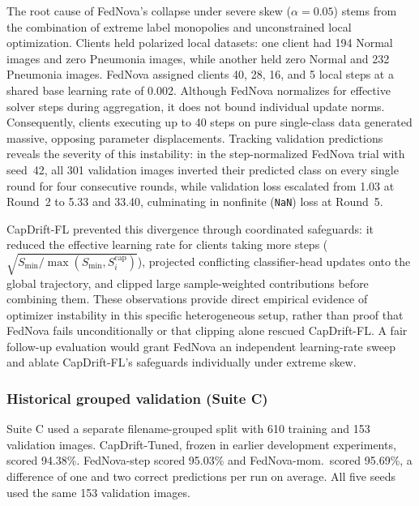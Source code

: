 \documentclass[conference]{IEEEtran}
\begin{document}
The root cause of FedNova's collapse under severe skew ($\alpha=0.05$) stems from the combination of extreme label monopolies and unconstrained local optimization. Clients held polarized local datasets: one client had 194 Normal images and zero Pneumonia images, while another held zero Normal and 232 Pneumonia images. FedNova assigned clients 40, 28, 16, and 5 local steps at a shared base learning rate of 0.002. Although FedNova normalizes for effective solver steps during aggregation, it does not bound individual update norms. Consequently, clients executing up to 40 steps on pure single-class data generated massive, opposing parameter displacements. Tracking validation predictions reveals the severity of this instability: in the step-normalized FedNova trial with seed~42, all 301 validation images inverted their predicted class on every single round for four consecutive rounds, while validation loss escalated from 1.03 at Round~2 to 5.33 and 33.40, culminating in nonfinite (\texttt{NaN}) loss at Round~5.

CapDrift-FL prevented this divergence through coordinated safeguards: it reduced the effective learning rate for clients taking more steps ($\sqrt{S_{\min}/\max(S_{\min}, S_i^{\mathrm{cap}})}$), projected conflicting classifier-head updates onto the global trajectory, and clipped large sample-weighted contributions before combining them. These observations provide direct empirical evidence of optimizer instability in this specific heterogeneous setup, rather than proof that FedNova fails unconditionally or that clipping alone rescued CapDrift-FL. A fair follow-up evaluation would grant FedNova an independent learning-rate sweep and ablate CapDrift-FL's safeguards individually under extreme skew.

\subsubsection{Historical grouped validation (Suite C)}

Suite C used a separate filename-grouped split with 610 training and 153 validation images. CapDrift-Tuned, frozen in earlier development experiments, scored 94.38\%. FedNova-step scored 95.03\% and FedNova-mom.\ scored 95.69\%, a difference of one and two correct predictions per run on average. All five seeds used the same 153 validation images.
\end{document}
